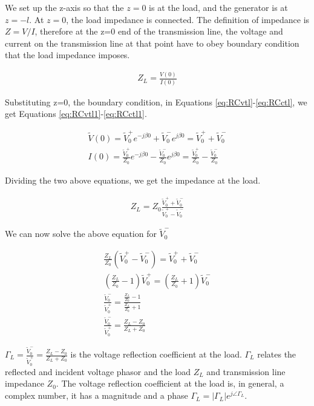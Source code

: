 \documentclass{ximera}
\begin{document}
We set up the z-axis so that the $z=0$ is at the load, and the generator is at $z=-l$. At $z=0$, the load impedance is connected. The definition of impedance is $Z=V/I$, therefore at the z=0 end of the transmission line, the voltage and current on the transmission line at that point have to obey boundary condition that the load impedance imposes.

\begin{eqnarray}
Z_L=\frac{V(0)}{I(0)} \nonumber 
\end{eqnarray}

Substituting z=0, the boundary condition, in Equations \ref{eq:RCvtl}-\ref{eq:RCctl}, we get Equations \ref{eq:RCvtl1}-\ref{eq:RCctl1}.

\begin{eqnarray}
\tilde{V}(0)=\tilde{V}_0^+ e^{-j \beta 0} +\tilde{V}_0^- e^{j \beta 0} = \tilde{V}_0^+ + \tilde{V}_0^- \label{eq:RCvtl1} \\ 
I(0)=\frac{\tilde{V}_0^+}{Z_0} e^{- j \beta 0} - \frac{\tilde{V}_0^-}{Z_0} e^{ j \beta 0} =\frac{\tilde{V}_0^+}{Z_0} - \frac{\tilde{V}_0^-}{Z_0}\label{eq:RCctl1}
\end{eqnarray}

Dividing the two above equations, we get the impedance at the load.


\begin{eqnarray}
Z_L=Z_0 \frac{\tilde{V}_0^+ + \tilde{V}_0^-}{\tilde{V}_0^+ - \tilde{V}_0^-}
\end{eqnarray}


We can now solve the above equation for $\tilde{V}_0^-$

\begin{eqnarray}
\frac{Z_L}{Z_0} (\tilde{V}_0^+ - \tilde{V}_0^-) = \tilde{V}_0^+ + \tilde{V}_0^- \nonumber \\
(\frac{Z_L}{Z_0}-1)\tilde{V}_0^+ =(\frac{Z_L}{Z_0}+1) \tilde{V}_0^- \nonumber \\
\frac{\tilde{V}_0^-}{\tilde{V}_0^+} = \frac{\frac{Z_L}{Z_0}-1  }{ \frac{Z_L}{Z_0}+1 }
\nonumber \\
\frac{\tilde{V}_0^-}{\tilde{V}_0^+} = \frac{Z_L -Z_0}{Z_L +Z_0}
\end{eqnarray}


\begin{definition}
$\Gamma_L=\frac{\tilde{V}_0^-}{\tilde{V}_0^+}= \frac{Z_L -Z_0}{Z_L +Z_0}$ is the voltage reflection
coefficient at the load. $\Gamma_L$ relates the reflected and incident voltage
phasor and the load $Z_L$ and transmission line impedance $Z_0$. The voltage reflection coefficient at the load is, in general, a complex number,
it has a magnitude and a phase $\Gamma_L=|\Gamma_L| e^{j \angle \Gamma_L}$.

\end{definition}
\end{document}
